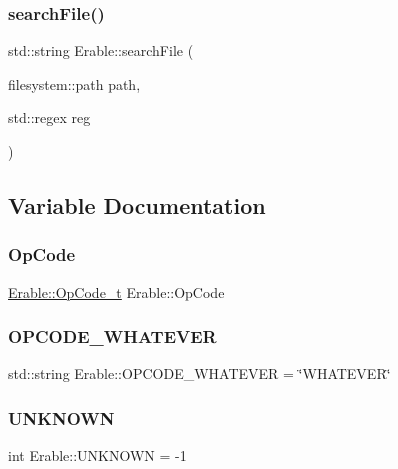 \mbox{\label{namespace_erable_a74b626ab901e5877e4c3af2645d10da7}} 
\subsubsection{\texorpdfstring{searchFile()}{searchFile()}}
{\footnotesize\ttfamily std\+::string Erable\+::search\+File (\begin{DoxyParamCaption}\item[{filesystem\+::path}]{path,  }\item[{std\+::regex}]{reg }\end{DoxyParamCaption})}



\subsection{Variable Documentation}
\mbox{\label{namespace_erable_adf78214f7408cc5507bb91e4e022379c}} 
\subsubsection{\texorpdfstring{OpCode}{OpCode}}
{\footnotesize\ttfamily \mbox{\hyperlink{class_erable_1_1_op_code__t}{Erable\+::\+Op\+Code\+\_\+t}} Erable\+::\+Op\+Code\hspace{0.3cm}{\ttfamily [inline]}}

\mbox{\label{namespace_erable_a60c921f1f338c12555495547451795f3}} 
\subsubsection{\texorpdfstring{OPCODE\_WHATEVER}{OPCODE\_WHATEVER}}
{\footnotesize\ttfamily std\+::string Erable\+::\+O\+P\+C\+O\+D\+E\+\_\+\+W\+H\+A\+T\+E\+V\+ER = \char`\"{}W\+H\+A\+T\+E\+V\+ER\char`\"{}\hspace{0.3cm}{\ttfamily [inline]}}

\mbox{\label{namespace_erable_a6d9e1e498f68cd7fa1c71cb362c89333}} 
\subsubsection{\texorpdfstring{UNKNOWN}{UNKNOWN}}
{\footnotesize\ttfamily int Erable\+::\+U\+N\+K\+N\+O\+WN = -\/1\hspace{0.3cm}{\ttfamily [inline]}}

